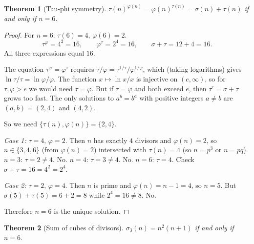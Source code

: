 \documentclass[11pt]{amsart}
\newtheorem{theorem}{Theorem}
\theoremstyle{remark}
\begin{document}
\begin{theorem}[Tau-phi symmetry]\label{thm:tau-phi-sym}
$\tau(n)^{\varphi(n)} = \varphi(n)^{\tau(n)} = \sigma(n) + \tau(n)$
if and only if $n = 6$.
\end{theorem}

\begin{proof}
For $n = 6$: $\tau(6) = 4$, $\varphi(6) = 2$.
\[
  \tau^{\varphi} = 4^2 = 16,\qquad
  \varphi^{\tau} = 2^4 = 16,\qquad
  \sigma + \tau = 12 + 4 = 16.
\]
All three expressions equal $16$. \checkmark

The equation $\tau^{\varphi} = \varphi^{\tau}$ requires
$\tau/\varphi = \tau^{1/\tau}/\varphi^{1/\varphi}$, which
(taking logarithms) gives $\ln\tau/\tau = \ln\varphi/\varphi$.
The function $x \mapsto \ln x / x$ is injective on $(e, \infty)$,
so for $\tau, \varphi > e$ we would need $\tau = \varphi$.
But if $\tau = \varphi$ and both exceed $e$, then
$\tau^{\tau} = \sigma + \tau$ grows too fast.
The only solutions to $a^b = b^a$ with positive integers $a \neq b$
are $(a,b) = (2,4)$ and $(4,2)$.

So we need $\{\tau(n), \varphi(n)\} = \{2, 4\}$.

\emph{Case 1:} $\tau = 4$, $\varphi = 2$.
Then $n$ has exactly $4$ divisors and $\varphi(n) = 2$,
so $n \in \{3, 4, 6\}$ (from $\varphi(n) = 2$) intersected with
$\tau(n) = 4$ (so $n = p^3$ or $n = pq$).
$n = 3$: $\tau = 2 \neq 4$. No.
$n = 4$: $\tau = 3 \neq 4$. No.
$n = 6$: $\tau = 4$. Check $\sigma + \tau = 16 = 4^2 = 2^4$. \checkmark

\emph{Case 2:} $\tau = 2$, $\varphi = 4$.
Then $n$ is prime and $\varphi(n) = n - 1 = 4$, so $n = 5$.
But $\sigma(5) + \tau(5) = 6 + 2 = 8$ while $2^4 = 16 \neq 8$. No.

Therefore $n = 6$ is the unique solution.
\end{proof}

\begin{theorem}[Sum of cubes of divisors]\label{thm:sigma3}
$\sigma_3(n) = n^2(n + 1)$ if and only if $n = 6$.
\end{theorem}
\end{document}
